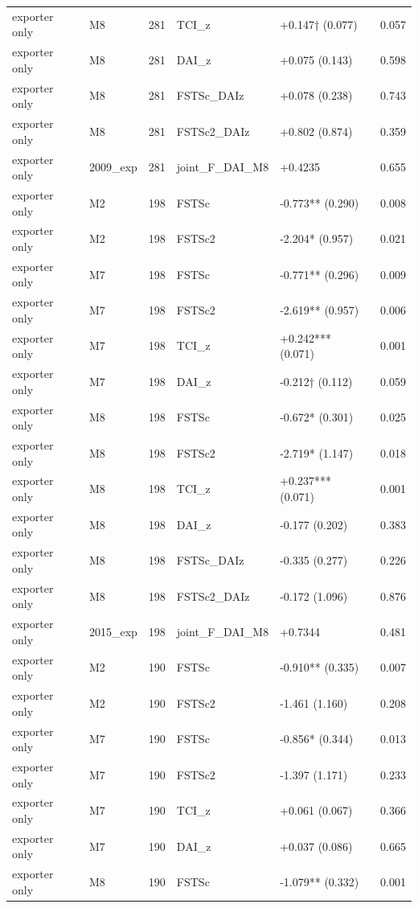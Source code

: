 \documentclass[12pt,a4paper]{article}
\begin{document}
\begin{longtable}[]{@{}llllll@{}}
exporter only & M8 & 281 & TCI\_z & +0.147† (0.077) & 0.057 \\
exporter only & M8 & 281 & DAI\_z & +0.075 (0.143) & 0.598 \\
exporter only & M8 & 281 & FSTSc\_DAIz & +0.078 (0.238) & 0.743 \\
exporter only & M8 & 281 & FSTSc2\_DAIz & +0.802 (0.874) & 0.359 \\
exporter only & 2009\_exp & 281 & joint\_F\_DAI\_M8 & +0.4235 & 0.655 \\
exporter only & M2 & 198 & FSTSc & -0.773** (0.290) & 0.008 \\
exporter only & M2 & 198 & FSTSc2 & -2.204* (0.957) & 0.021 \\
exporter only & M7 & 198 & FSTSc & -0.771** (0.296) & 0.009 \\
exporter only & M7 & 198 & FSTSc2 & -2.619** (0.957) & 0.006 \\
exporter only & M7 & 198 & TCI\_z & +0.242*** (0.071) & 0.001 \\
exporter only & M7 & 198 & DAI\_z & -0.212† (0.112) & 0.059 \\
exporter only & M8 & 198 & FSTSc & -0.672* (0.301) & 0.025 \\
exporter only & M8 & 198 & FSTSc2 & -2.719* (1.147) & 0.018 \\
exporter only & M8 & 198 & TCI\_z & +0.237*** (0.071) & 0.001 \\
exporter only & M8 & 198 & DAI\_z & -0.177 (0.202) & 0.383 \\
exporter only & M8 & 198 & FSTSc\_DAIz & -0.335 (0.277) & 0.226 \\
exporter only & M8 & 198 & FSTSc2\_DAIz & -0.172 (1.096) & 0.876 \\
exporter only & 2015\_exp & 198 & joint\_F\_DAI\_M8 & +0.7344 & 0.481 \\
exporter only & M2 & 190 & FSTSc & -0.910** (0.335) & 0.007 \\
exporter only & M2 & 190 & FSTSc2 & -1.461 (1.160) & 0.208 \\
exporter only & M7 & 190 & FSTSc & -0.856* (0.344) & 0.013 \\
exporter only & M7 & 190 & FSTSc2 & -1.397 (1.171) & 0.233 \\
exporter only & M7 & 190 & TCI\_z & +0.061 (0.067) & 0.366 \\
exporter only & M7 & 190 & DAI\_z & +0.037 (0.086) & 0.665 \\
exporter only & M8 & 190 & FSTSc & -1.079** (0.332) & 0.001 \\

\end{longtable}
\end{document}
